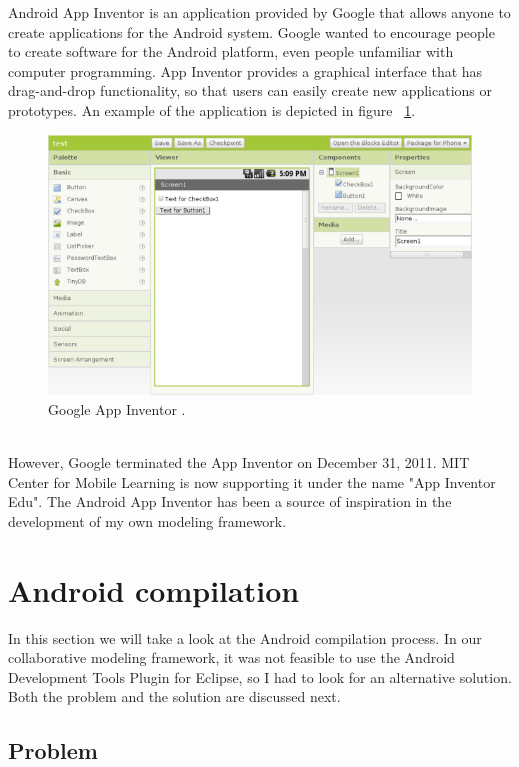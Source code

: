 Android App Inventor is an application provided by Google that allows anyone to create applications for the Android system. Google wanted to encourage people to create software for the Android platform, even people unfamiliar with computer programming. App Inventor provides a graphical interface that has drag-and-drop functionality, so that users can easily create new applications or prototypes. An example of the application is depicted in figure ~\ref{fig:app_inventor}.
\begin{figure}[h!]
\centering
\includegraphics[width=1.0\textwidth]{images/chap4_app_inventor.png}
\caption{Google App Inventor \cite{AppInventor}.}
\label{fig:app_inventor}
\end{figure} \\
However, Google terminated the App Inventor on December 31, 2011. MIT Center for Mobile Learning is now supporting it under the name "App Inventor Edu". The Android App Inventor has been a source of inspiration in the development of my own modeling framework. 

\section{Android compilation}

In this section we will take a look at the Android compilation process. In our collaborative modeling framework, it was not feasible to use the Android Development Tools Plugin for Eclipse, so I had to look for an alternative solution. Both the problem and the solution are discussed next.

\subsection{Problem}

